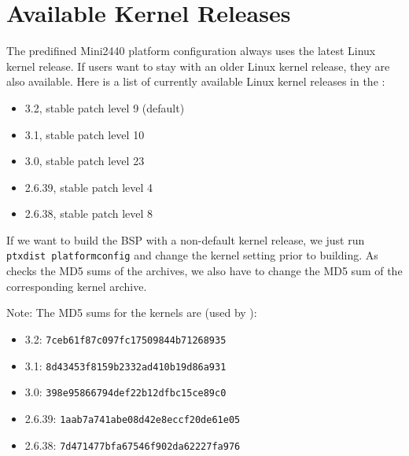 %
%
%
%
%
%

\newcommand{\perCpuName}{S3C2440}
\newcommand{\curKernelRev}{3.2}

\section{Available Kernel Releases}	\label{sec:kernelreleases}

The predifined Mini2440 platform configuration always uses the latest Linux
kernel release. If users want to stay with an older Linux kernel release,
they are also available. Here is a list of currently available Linux kernel
releases in the \ptxdistBSPName{}:

\begin{itemize}
	\item \curKernelRev{}, stable patch level 9 (default)
	\item 3.1, stable patch level 10
	\item 3.0, stable patch level 23
	\item 2.6.39, stable patch level 4
	\item 2.6.38, stable patch level 8
\end{itemize}

If we want to build the BSP with a non-default kernel release, we just run
\texttt{ptxdist platformconfig} and change the kernel setting prior to building.
As \ptxdist{} checks the MD5 sums of the archives, we also have to change the
MD5 sum of the corresponding kernel archive.

Note: The MD5 sums for the kernels are (used by \ptxdist{}):
\begin{itemize}
	\item 3.2: \texttt{7ceb61f87c097fc17509844b71268935}
	\item 3.1: \texttt{8d43453f8159b2332ad410b19d86a931}
	\item 3.0: \texttt{398e95866794def22b12dfbc15ce89c0}
	\item 2.6.39: \texttt{1aab7a741abe08d42e8eccf20de61e05}
	\item 2.6.38: \texttt{7d471477bfa67546f902da62227fa976}
\end{itemize}

